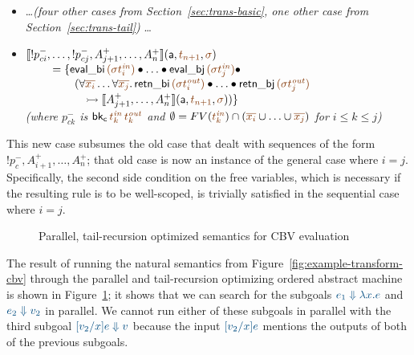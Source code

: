 \smallskip
\begin{itemize}
\item \ldots {\it (four other cases from Section~\ref{sec:trans-basic}, one other case from Section~\ref{sec:trans-tail})} \ldots
\item $\opbasic{{!}p^-_{ci},\ldots,{!}p^-_{cj},A^+_{j+1},\ldots,A^+_n}{t_{n+1}}{\sigma}$
  \\
  $~ \qquad = \{ {\sf eval\_bi}\,\lf{({\sigma}t^{\it in}_i)} 
                    \fuse \ldots \fuse
                 {\sf eval\_bj}\,\lf{({\sigma}t^{\it in}_j)} \fuse ~$
  \\
  $~ \qquad \qquad (\forall\lf{\overline{x_i}}\ldots\forall\lf{\overline{x_j}}.\, 
     {\sf retn\_bi}\,\lf{(\sigma{t^{\it out}_i})}
     \fuse \ldots \fuse 
     {\sf retn\_bj}\,\lf{(\sigma{t^{\it out}_j})}$
  \\
  $~ \qquad \qquad \quad
   \lefti \opbasic{A^+_{j+1},\ldots,A^+_n}{t_{n+1}}{\sigma}) \}$\\
  {\it (where
   $p^-_{ck}$ is ${\sf bk_c}\,\lf{t^{\it in}_k}\,\lf{t^{\it out}_k}$ 
   and $\emptyset = FV(\lf{t_k^{\it in}}) \cap (\lf{\overline{x_i}} \cup \ldots \cup \lf{\overline{x_j}})$ 
   for $i \leq k \leq j$)}
\end{itemize}
\smallskip This new case subsumes the old case that dealt with
sequences of the form ${!}p_c^-, A^+_{i+1},\ldots,A^+_n$; that old
case is now an instance of the general case where $i = j$.
Specifically, the second side condition on the free variables,
which is necessary if the resulting rule is to be well-scoped, is
trivially satisfied in the sequential case where $i = j$.

\begin{figure}
\caption{Parallel, tail-recursion optimized semantics for
 CBV evaluation}
\label{fig:cbv-ev-ssos-par}
\end{figure}

The result of running the natural semantics from
Figure~\ref{fig:example-transform-cbv} through the parallel and
tail-recursion optimizing ordered abstract machine is shown in
Figure~\ref{fig:cbv-ev-ssos-par}; it shows that we can
search for the subgoals $\obj{e_1 \Downarrow \lambda x.e}$ and
$\obj{e_2 \Downarrow v_2}$ in parallel. We cannot run either
of these subgoals in parallel with the third subgoal 
$\obj{[v_2/x]e \Downarrow v}$ because the input 
$\obj{[v_2/x]e}$ mentions the outputs
of both of the previous subgoals. 

